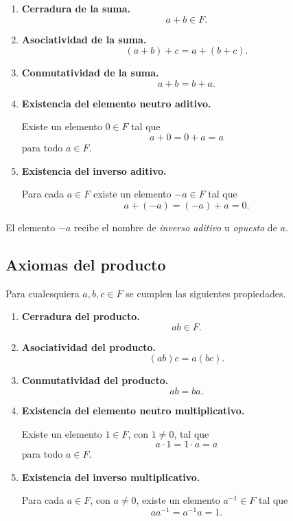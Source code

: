 \documentclass[12pt]{article}
\theoremstyle{plain}
\theoremstyle{definition}
\theoremstyle{remark}
\begin{document}
\begin{enumerate}[label=\textbf{A\arabic*.}]

    \item \textbf{Cerradura de la suma.}
    \[
    a+b\in F.
    \]

    \item \textbf{Asociatividad de la suma.}
    \[
    (a+b)+c=a+(b+c).
    \]

    \item \textbf{Conmutatividad de la suma.}
    \[
    a+b=b+a.
    \]

    \item \textbf{Existencia del elemento neutro aditivo.}

    Existe un elemento $0\in F$ tal que
    \[
    a+0=0+a=a
    \]
    para todo $a\in F$.

    \item \textbf{Existencia del inverso aditivo.}

    Para cada $a\in F$ existe un elemento $-a\in F$ tal que
    \[
    a+(-a)=(-a)+a=0.
    \]

\end{enumerate}

El elemento $-a$ recibe el nombre de \emph{inverso aditivo} u
\emph{opuesto} de $a$.

\subsection*{Axiomas del producto}

Para cualesquiera $a,b,c\in F$ se cumplen las siguientes propiedades.

\begin{enumerate}[label=\textbf{M\arabic*.}]

    \item \textbf{Cerradura del producto.}
    \[
    ab\in F.
    \]

    \item \textbf{Asociatividad del producto.}
    \[
    (ab)c=a(bc).
    \]

    \item \textbf{Conmutatividad del producto.}
    \[
    ab=ba.
    \]

    \item \textbf{Existencia del elemento neutro multiplicativo.}

    Existe un elemento $1\in F$, con $1\neq0$, tal que
    \[
    a\cdot1=1\cdot a=a
    \]
    para todo $a\in F$.

    \item \textbf{Existencia del inverso multiplicativo.}

    Para cada $a\in F$, con $a\neq0$, existe un elemento
    $a^{-1}\in F$ tal que
    \[
    aa^{-1}=a^{-1}a=1.
    \]

\end{enumerate}
\end{document}
